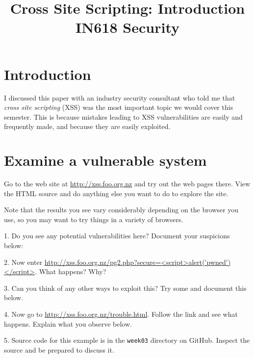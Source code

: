 \documentclass{article}
\begin{document}
\title{Cross Site Scripting: Introduction\\ IN618 Security}
\date{}
\maketitle

\section*{Introduction}
I discussed this paper with an industry security consultant who told me that 
\emph{cross site scripting} (XSS) was the most important topic we would cover this 
semester. This is because mistakes leading to XSS vulnerabilities are easily
and frequently made, and because they are easily exploited. 

\section*{Examine a vulnerable system}
Go to the web site at \url{http://xss.foo.org.nz} and try out the web 
pages there.  View the HTML source and do anything else you want to 
do to explore the site.

Note that the results you see vary considerably depending on the browser you use, so you may want to try things in a variety of browsers.

1. Do you see any potential vulnerabilities here?  Document your
suspicions below:

\vspace{60mm}

2. Now enter \url{http://xss.foo.org.nz/pg2.php?secure=<script>alert('pwned')</script>}.  What happens?  Why?

\vspace{60mm}

3. Can you think of any other ways to exploit this?  Try some and 
document this below.

\vspace{60mm}



4. Now go to \url{http://xss.foo.org.nz/trouble.html}.  Follow the 
link and see what happens.  Explain what you observe below.

\vspace{90mm}

5. Source code for this example is in the \texttt{week03} directory on GitHub.
Inspect the source and be prepared to discuss it.
\end{document}
